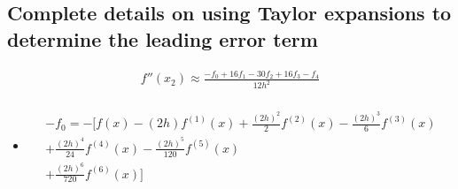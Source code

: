 \newpage
\subsection{Complete details on using Taylor expansions to determine the leading error term}
\begin{align*}
    f''(x_2) \approx \frac{-f_0 + 16 f_1 - 30f_2 + 16f_3 -f_4}{12h^2} \\
\end{align*}

\begin{itemize}
    \item
        \begin{align*}
            -f_0 = - [f(x) - (2h)f^{(1)}(x) + \frac{(2h)^2}{2} f^{(2)}(x) - \frac{(2h)^3}{6} f^{(3)}(x) \\
            + \frac{(2h)^4}{24} f^{(4)}(x) - \frac{(2h)^5}{120} f^{(5)}(x) \\ 
            + \frac{(2h)^6}{720} f^{(6)}(x)  ]
        \end{align*}
\end{itemize}
